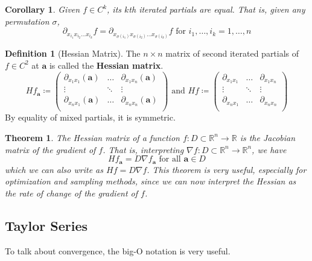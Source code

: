 \documentclass{article}
\newtheorem{theorem}{Theorem}[section]
\newtheorem{corollary}{Corollary}[theorem]
\theoremstyle{remark}
\theoremstyle{definition}
\newtheorem{definition}{Definition}[section]
\begin{document}
\begin{corollary}
Given $f \in C^k$, its $k$th iterated partials are equal. That is, given any permutation $\sigma$, 
\[\partial_{x_{i_1} x_{i_2} \ldots x_{i_k}} f = \partial_{x_{\sigma(i_1)} x_{\sigma(i_2)} \ldots x_{\sigma(i_k)}} f \text{ for } i_1, \ldots, i_k = 1, \ldots, n\]
\end{corollary}

\begin{definition}[Hessian Matrix]
The $n \times n$ matrix of second iterated partials of $f \in C^2$ at $\mathbf{a}$ is called the \textbf{Hessian matrix}. 
\[H f_\mathbf{a} \coloneqq \begin{pmatrix} 
\partial_{x_1 x_1} (\mathbf{a}) & \ldots & \partial_{x_1 x_n} (\mathbf{a}) \\
\vdots & \ddots & \vdots \\
\partial_{x_n x_1} (\mathbf{a}) & \ldots & \partial_{x_n x_n} (\mathbf{a}) \\
\end{pmatrix} \text{ and } H f \coloneqq \begin{pmatrix} 
\partial_{x_1 x_1} & \ldots & \partial_{x_1 x_n} \\
\vdots & \ddots & \vdots \\
\partial_{x_n x_1} & \ldots & \partial_{x_n x_n} \\
\end{pmatrix}\]
By equality of mixed partials, it is symmetric. 
\end{definition}

\begin{theorem}
The Hessian matrix of a function $f: D \subset \mathbb{R}^n \longrightarrow \mathbb{R}$ is the Jacobian matrix of the gradient of $f$. That is, interpreting $\nabla f: D \subset \mathbb{R}^n \longrightarrow \mathbb{R}^n$, we have
\[H f_\mathbf{a} = D \nabla f_\mathbf{a} \text{ for all } \mathbf{a} \in D\]
which we can also write as $H f = D \nabla f$. This theorem is very useful, especially for optimization and sampling methods, since we can now interpret the Hessian as the rate of change of the gradient of $f$. 
\end{theorem}

\subsection{Taylor Series}

To talk about convergence, the big-O notation is very useful. 
\end{document}
